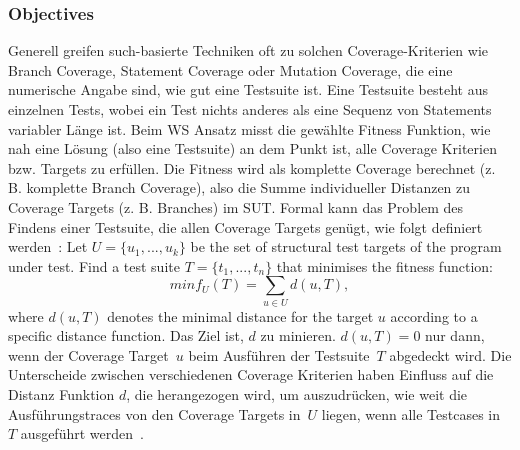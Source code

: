 \documentclass{article}
\begin{document}
\subsubsection{Objectives}
Generell greifen such-basierte Techniken oft zu solchen Coverage-Kriterien wie Branch Coverage, Statement Coverage oder Mutation Coverage, die eine numerische Angabe sind, wie gut eine Testsuite ist. Eine Testsuite besteht aus einzelnen Tests, wobei ein Test nichts anderes als eine Sequenz von Statements variabler Länge ist. Beim \ac{WS} Ansatz misst die gewählte Fitness Funktion, wie nah eine Lösung (also eine Testsuite) an dem Punkt ist, alle Coverage Kriterien bzw. Targets zu erfüllen. Die Fitness wird als komplette Coverage berechnet (z. B. komplette Branch Coverage), also die Summe individueller Distanzen zu Coverage Targets (z. B. Branches) im \ac{SUT}. Formal kann das Problem des Findens einer Testsuite, die allen Coverage Targets genügt, wie folgt definiert werden~\cite{Panichella2018}: Let $U = \{u_1, ..., u_k\}$ be the set of structural test targets of the program under test. Find a test suite $T = \{t_1, ..., t_n\}$ that minimises the fitness function: 
\begin{equation}
minf_U(T) = \sum_{u \in U}{d(u, T)},
\end{equation}
where $d(u, T)$ denotes the minimal distance for the target $u$ according to a specific distance function. Das Ziel ist, $d$ zu minieren. $d(u, T) = 0$ nur dann, wenn der Coverage Target~$u$ beim Ausführen der Testsuite~$T$ abgedeckt wird. Die Unterscheide zwischen verschiedenen Coverage Kriterien haben Einfluss auf die Distanz Funktion $d$, die herangezogen wird, um auszudrücken, wie weit die Ausführungstraces von den Coverage Targets in~$U$ liegen, wenn alle Testcases in~$T$ ausgeführt werden~\cite{Panichella2018}. 
\end{document}
